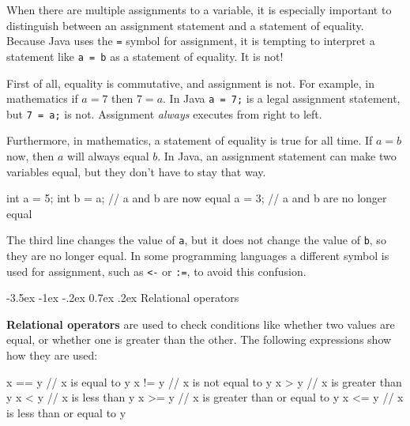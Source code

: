 \documentclass[12pt]{book}
\makeatletter
\theoremstyle{exercise}
\newcommand{\java}[1]{\verb"#1"}
\renewcommand{\section}{\@startsection{section}{1}{\z@}%
    {-3.5ex \@plus -1ex \@minus -.2ex}%
    {0.7ex \@plus.2ex}%
    {\normalfont\Large\bfseries}}
\newcommand{\java}[1]{\lstinline{#1}} %
\makeatother
\begin{document}
When there are multiple assignments to a variable, it is especially important to distinguish between an assignment statement and a statement of equality.
Because Java uses the \java{=} symbol for assignment, it is tempting to interpret a statement like \java{a = b} as a statement of equality.
It is not!

First of all, equality is commutative, and assignment is not.
For example, in mathematics if $a = 7$ then $7 = a$.
In Java \java{a = 7;} is a legal assignment statement, but \java{7 = a;} is not.
Assignment {\em always} executes from right to left.

Furthermore, in mathematics, a statement of equality is true for all time.
If $a = b$ now, then $a$ will always equal $b$.
In Java, an assignment statement can make two variables equal, but they don't have to stay that way.

\begin{code}
    int a = 5;
    int b = a;     // a and b are now equal
    a = 3;         // a and b are no longer equal
\end{code}

The third line changes the value of \java{a}, but it does not change the value of \java{b}, so they are no longer equal.
In some programming languages a different symbol is used for assignment, such as {\tt <-} or {\tt :=}, to avoid this confusion.



\section{Relational operators}


{\bf Relational operators} are used to check conditions like whether two values are equal, or whether one is greater than the other.
The following expressions show how they are used:

\begin{code}
    x == y          // x is equal to y
    x != y          // x is not equal to y
    x > y           // x is greater than y
    x < y           // x is less than y
    x >= y          // x is greater than or equal to y
    x <= y          // x is less than or equal to y
\end{code}
\end{document}
